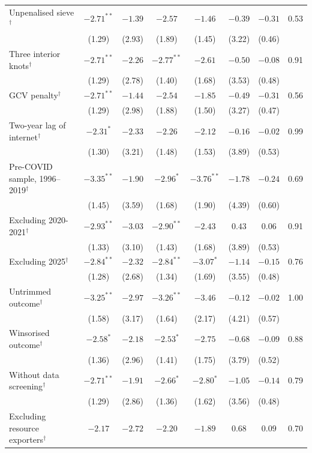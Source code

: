 \documentclass[pdflatex,sn-basic]{sn-jnl}%
\theoremstyle{thmstyleone}
\theoremstyle{thmstyletwo}
\renewenvironment{table}[1][]{\begin{tableorg}[#1]\centering\tablebodyfont}{\end{tableorg}}
\begin{document}
\begin{appendices}
\begin{table}[!p]
{\begin{threeparttable}
\begin{tabular}{lccccccc}
\quad Unpenalised sieve$^{\dagger}$ & $-2.71^{**}$ & $-1.39$ & $-2.57$ & $-1.46$ & $-0.39$ & $-0.31$ & 0.53\\
 & (1.29) & (2.93) & (1.89) & (1.45) & (3.22) & (0.46) & \\
\quad Three interior knots$^{\dagger}$ & $-2.71^{**}$ & $-2.26$ & $-2.77^{**}$ & $-2.61$ & $-0.50$ & $-0.08$ & 0.91\\
 & (1.29) & (2.78) & (1.40) & (1.68) & (3.53) & (0.48) & \\
\quad GCV penalty$^{\dagger}$ & $-2.71^{**}$ & $-1.44$ & $-2.54$ & $-1.85$ & $-0.49$ & $-0.31$ & 0.56\\
 & (1.29) & (2.98) & (1.88) & (1.50) & (3.27) & (0.47) & \\
\quad Two-year lag of internet$^{\dagger}$ & $-2.31^{*}$ & $-2.33$ & $-2.26$ & $-2.12$ & $-0.16$ & $-0.02$ & 0.99\\
 & (1.30) & (3.21) & (1.48) & (1.53) & (3.89) & (0.53) & \\
\quad Pre-COVID sample, 1996--2019$^{\dagger}$ & $-3.35^{**}$ & $-1.90$ & $-2.96^{*}$ & $-3.76^{**}$ & $-1.78$ & $-0.24$ & 0.69\\
 & (1.45) & (3.59) & (1.68) & (1.90) & (4.39) & (0.60) & \\
\quad Excluding 2020-2021$^{\dagger}$ & $-2.93^{**}$ & $-3.03$ & $-2.90^{**}$ & $-2.43$ & $0.43$ & $0.06$ & 0.91\\
 & (1.33) & (3.10) & (1.43) & (1.68) & (3.89) & (0.53) & \\
\quad Excluding 2025$^{\dagger}$ & $-2.84^{**}$ & $-2.32$ & $-2.84^{**}$ & $-3.07^{*}$ & $-1.14$ & $-0.15$ & 0.76\\
 & (1.28) & (2.68) & (1.34) & (1.69) & (3.55) & (0.48) & \\
\quad Untrimmed outcome$^{\dagger}$ & $-3.25^{**}$ & $-2.97$ & $-3.26^{**}$ & $-3.46$ & $-0.12$ & $-0.02$ & 1.00\\
 & (1.58) & (3.17) & (1.64) & (2.17) & (4.21) & (0.57) & \\
\quad Winsorised outcome$^{\dagger}$ & $-2.58^{*}$ & $-2.18$ & $-2.53^{*}$ & $-2.75$ & $-0.68$ & $-0.09$ & 0.88\\
 & (1.36) & (2.96) & (1.41) & (1.75) & (3.79) & (0.52) & \\
\quad Without data screening$^{\dagger}$ & $-2.71^{**}$ & $-1.91$ & $-2.66^{*}$ & $-2.80^{*}$ & $-1.05$ & $-0.14$ & 0.79\\
 & (1.29) & (2.86) & (1.36) & (1.62) & (3.56) & (0.48) & \\
\quad Excluding resource exporters$^{\dagger}$ & $-2.17$ & $-2.72$ & $-2.20$ & $-1.89$ & $0.68$ & $0.09$ & 0.70\\

\end{tabular}
\end{threeparttable}}
\end{table}
\end{appendices}
\end{document}
